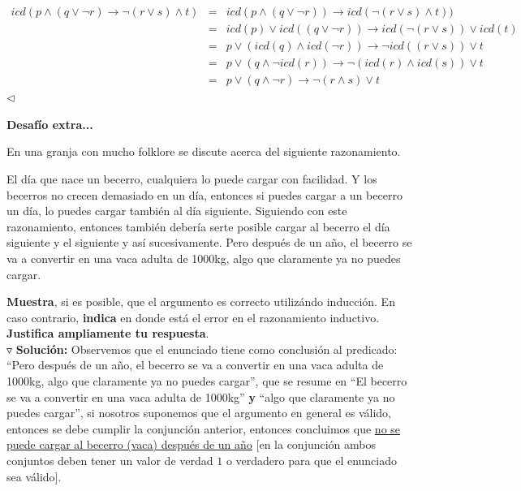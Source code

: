 \documentclass{article}
\begin{document}
\begin{enumerate}
\begin{eqnarray*}
    icd(p \land (q \lor \neg r) \rightarrow \neg (r \lor s) \land t) &=&
    icd(p \land (q \lor \neg r)) \rightarrow icd(\neg (r \lor s) \land t))\\
    &=& icd(p) \lor icd((q \lor \neg r)) \rightarrow icd(\neg (r \lor s)) \lor icd(t)\\
    &=& p \lor (icd(q) \land icd(\neg r)) \rightarrow \neg icd((r \lor s)) \lor t\\
    &=& p \lor (q \land \neg icd(r)) \rightarrow \neg (icd(r) \land icd(s)) \lor t\\
    &=& p \lor (q \land \neg r) \rightarrow \neg (r \land s) \lor t
  \end{eqnarray*}
  \hfill $\lhd$
\end{enumerate}

\textbf{Desafío extra...}

En una granja con mucho folklore se discute acerca del siguiente razonamiento.

\hspace*{0.5cm} \guillemotleft El día que nace un becerro, cualquiera lo puede cargar con
facilidad. Y los becerros no crecen demasiado en un día, entonces si puedes cargar a un
becerro un día, lo puedes cargar también al día siguiente. Siguiendo con este razonamiento,
entonces también debería serte posible cargar al becerro el día siguiente y el siguiente y
así sucesivamente. Pero después de un año, el becerro se va a convertir en una vaca adulta
de 1000kg, algo que claramente ya no puedes cargar.\guillemotright

\hspace*{0.5cm} \textbf{Muestra}, si es posible, que el argumento es correcto utilizándo
inducción. En caso contrario, \textbf{indica} en donde está el error en el razonamiento
inductivo. \textbf{Justifica ampliamente tu respuesta}.
\\

$\triangledown$ \textbf{Solución:}
Observemos que el enunciado tiene como conclusión al predicado: ``Pero después de un año,
el becerro se va a convertir en una vaca adulta de 1000kg, algo que claramente ya no puedes
cargar'', que se resume en ``El becerro se va a convertir en una vaca adulta de 1000kg''
\textbf{y} ``algo que claramente ya no puedes cargar'', si nosotros suponemos que el argumento
en general es válido, entonces se debe cumplir la conjunción anterior, entonces concluimos que
\underline{no se puede cargar al becerro (vaca) después de un año} [en la conjunción ambos
  conjuntos deben tener un valor de verdad $1$ o verdadero para que el enunciado sea válido].
\end{document}
